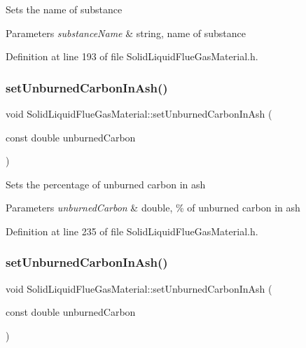 Sets the name of substance 
\begin{DoxyParams}{Parameters}
{\em substance\+Name} & string, name of substance \\
\hline
\end{DoxyParams}


Definition at line 193 of file Solid\+Liquid\+Flue\+Gas\+Material.\+h.

\mbox{\label{class_solid_liquid_flue_gas_material_adf052dd1bdceeab710a4986b1fd874b9}} 
\subsubsection{\texorpdfstring{set\+Unburned\+Carbon\+In\+Ash()}{setUnburnedCarbonInAsh()}\hspace{0.1cm}{\footnotesize\ttfamily [1/3]}}
{\footnotesize\ttfamily void Solid\+Liquid\+Flue\+Gas\+Material\+::set\+Unburned\+Carbon\+In\+Ash (\begin{DoxyParamCaption}\item[{const double}]{unburned\+Carbon }\end{DoxyParamCaption})\hspace{0.3cm}{\ttfamily [inline]}}

Sets the percentage of unburned carbon in ash 
\begin{DoxyParams}{Parameters}
{\em unburned\+Carbon} & double, \% of unburned carbon in ash \\
\hline
\end{DoxyParams}


Definition at line 235 of file Solid\+Liquid\+Flue\+Gas\+Material.\+h.

\mbox{\label{class_solid_liquid_flue_gas_material_adf052dd1bdceeab710a4986b1fd874b9}} 
\subsubsection{\texorpdfstring{set\+Unburned\+Carbon\+In\+Ash()}{setUnburnedCarbonInAsh()}\hspace{0.1cm}{\footnotesize\ttfamily [2/3]}}
{\footnotesize\ttfamily void Solid\+Liquid\+Flue\+Gas\+Material\+::set\+Unburned\+Carbon\+In\+Ash (\begin{DoxyParamCaption}\item[{const double}]{unburned\+Carbon }\end{DoxyParamCaption})\hspace{0.3cm}{\ttfamily [inline]}}

